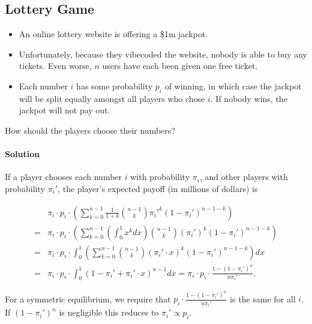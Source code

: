 \documentclass{article}
\newif\ifhasdiagram
\newcommand{\sectiondiagram}[1]{%
    \def\insertsdiagram{#1}%
    \hasdiagramtrue
}
\newcommand{\sectionquote}[1]{%
    \def\insertsquote{\small #1}%
}
\newcommand{\insertsdiagram}{}
\newcommand{\insertsquote}{}
\renewcommand{\insertsquote}{}%
\begin{document}
\subsection{Lottery Game}
\begin{block}{}
	\begin{itemize}
	\item An online lottery website is offering a \$1m jackpot.
	\item Unfortunately, because they vibecoded the website, nobody is able to buy any tickets. Even worse, $n$ users have each been given one free ticket.
	\item Each number $i$ has some probability $p_i$ of winning, in which case the jackpot will be split equally amongst all players who chose $i$. If nobody wins, the jackpot will not pay out.
	\end{itemize}

	How should the players choose their numbers?
\end{block}

\paragraph{Solution}

If a player chooses each number $i$ with probability $\pi_i$, and other players with probability $\pi_i'$, the player's expected payoff (in millions of dollars) is

\begin{align*}
		& \pi_i \cdot p_i \cdot \left(\sum_{k=0}^{n-1}\frac{1}{1+k}\binom{n-1}{k} \pi_i'^k (1-\pi_i')^{n-1-k}\right) \\
	=	& \pi_i \cdot p_i \cdot \left(\sum_{k=0}^{n-1} \left(\int_0^1 x^k dx\right)\binom{n-1}{k} (\pi_i')^k(1-\pi_i')^{n-1-k} \right) \\
	=	& \pi_i \cdot p_i \cdot \int_0^1 \left(\sum_{k=0}^{n-1} \binom{n-1}{k} (\pi_i'\cdot x)^k (1-\pi_i')^{n-1-k} \right)dx \\
	=	& \pi_i \cdot p_i \cdot \int_0^1 (1 - \pi_i' + \pi_i'\cdot x)^{n-1} dx = \pi_i \cdot p_i \cdot \frac{1 - (1-\pi_i')^n}{n\pi_i'}.
\end{align*}

For a symmetric equilibrium, we require that $p_i \cdot \frac{1 - (1-\pi_i')^n}{n\pi_i'}$ is the same for all $i$. If $(1-\pi_i')^n$ is negligible this reduces to $\pi_i'\propto p_i$.

\sectiondiagram{matching}
\sectionquote{``The most amazing achievement of the computer software industry is its continuing cancellation of the steady and staggering gains made by the computer hardware industry.'' Henry Petroski}
\end{document}
